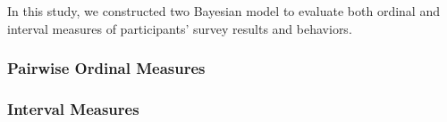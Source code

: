 In this study, we constructed two Bayesian model to evaluate both ordinal and interval measures of participants' survey results and behaviors.



\subsubsection{Pairwise Ordinal Measures}
\label{sec:ordinal_measures}


\subsubsection{Interval Measures}
\label{sec:interval_measures}

